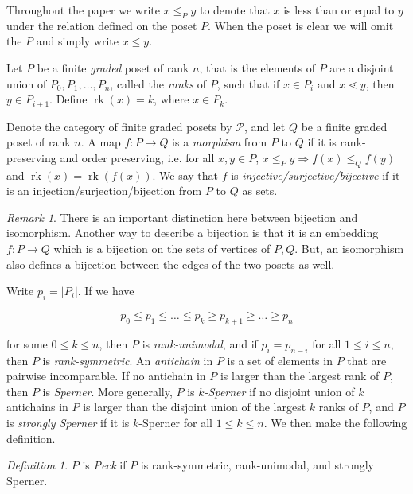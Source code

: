 \documentclass{amsart}
\theoremstyle{remark}
\newtheorem{rem}[thm]{Remark}
\newtheorem{defn}[thm]{Definition}
\newcommand\rk{\operatorname{rk}}
\begin{document}
Throughout the paper we write $x\le_P y$ to denote that $x$ is less than or equal to $y$ under the relation defined on the poset $P$. When the poset is clear we will omit the $P$ and simply write $x\le y$.

Let $P$ be a finite {\it graded} poset of rank $n$, that is the elements of $P$ are a disjoint union of $P_0,P_1,\ldots,P_n$, called the \textit{ranks} of $P$, such that if $x\in P_i$ and $x\lessdot y$, then $y\in P_{i+1}$.  Define $\rk(x) = k$, where $x\in P_k$.

Denote the category of finite graded posets by $\mathcal{P}$, and let $Q$ be a finite graded poset of rank $n$.  A map $f\colon P\rightarrow Q$ is a \textit{morphism} from $P$ to $Q$ if it is rank-preserving and order preserving, i.e. for all $x,y\in P$, $x\le_P y \Rightarrow f(x)\le_Q f(y)$ and $\rk(x) = \rk(f(x))$.  We say that $f$ is \textit{injective/surjective/bijective} if it is an injection/surjection/bijection from $P$ to $Q$ as sets.

\begin{rem}
There is an important distinction here between bijection and isomorphism. Another way to describe a bijection is that it is an embedding $f:P\rightarrow Q$ which is a bijection on the sets of vertices of $P,Q$. But, an isomorphism also defines a bijection between the edges of the two posets as well.
\end{rem}

Write $p_i = |P_i|$.  If we have

$$p_0\le p_1\le \ldots \le p_k \ge p_{k+1} \ge\ldots \ge p_n$$

\noindent for some $0\le k\le n$, then $P$ is \textit{rank-unimodal}, and if $p_i = p_{n-i}$ for all $1\le i\le n,$ then $P$ is \textit{rank-symmetric}.  An \textit{antichain} in $P$ is a set of elements in $P$ that are pairwise incomparable.  If no antichain in $P$ is larger than the largest rank of $P$, then $P$ is \textit{Sperner}.  More generally, $P$ is \textit{$k$-Sperner} if no disjoint union  of $k$ antichains in $P$ is larger than the disjoint union of the largest $k$ ranks of $P$, and $P$ is \textit{strongly Sperner} if it is $k$-Sperner for all $1\le k\le n$.  We then make the following definition.

\begin{defn}
$P$ is \textit{Peck} if $P$ is rank-symmetric, rank-unimodal, and strongly Sperner.
\end{defn}
\end{document}
